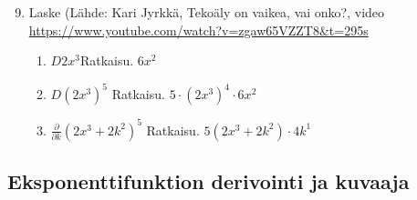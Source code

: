 \documentclass[10pt]{article}
\newcommand{\ratkaisu}[1]{\hfill{\color{blue}\quad\textrm{Ratkaisu. } #1}}
\begin{document}
\begin{enumerate}
\setcounter{enumi}{8}
\item Laske (Lähde: Kari Jyrkkä, Tekoäly on vaikea, vai onko?, video \url{https://www.youtube.com/watch?v=zgaw65VZZT8&t=295s}
\begin{enumerate}
\item $D2x^3$\ratkaisu{$6x^2
$}
\item $D(2x^3)^5$
\ratkaisu{$5\cdot (2x^3)^4\cdot 6x^2$}
\item $\frac{\partial}{\partial k}(2x^3+2k^2)^5$
\ratkaisu{$5(2x^3+2k^2)\cdot 4k^1$}
\end{enumerate}
\end{enumerate}

\newpage

\subsection{Eksponenttifunktion derivointi ja kuvaaja}
\end{document}

